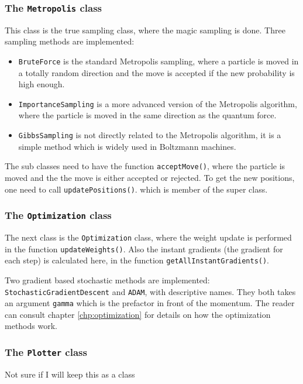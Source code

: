 \subsubsection{The \lstinline{Metropolis} class}
This class is the true sampling class, where the magic sampling is done. Three sampling methods are implemented:
\begin{itemize}
	\item \lstinline{BruteForce} is the standard Metropolis sampling, where a particle is moved in a totally random direction and the move is accepted if the new probability is high enough.

	\item \lstinline{ImportanceSampling} is a more advanced version of the Metropolis algorithm, where the particle is moved in the same direction as the quantum force.
	
	\item \lstinline{GibbsSampling} is not directly related to the Metropolis algorithm, it is a simple method which is widely used in Boltzmann machines.
\end{itemize}
The sub classes need to have the function \lstinline{acceptMove()}, where the particle is moved and the the move is either accepted or rejected. To get the new positions, one need to call \lstinline{updatePositions()}. which is member of the super class. 

\subsubsection{The \lstinline{Optimization} class}
The next class is the \lstinline{Optimization} class, where the weight update is performed in the function \lstinline{updateWeights()}. Also the instant gradients (the gradient for each step) is calculated here, in the function \lstinline{getAllInstantGradients()}.

Two gradient based stochastic methods are implemented: \lstinline{StochasticGradientDescent} and \lstinline{ADAM}, with descriptive names. They both takes an argument \lstinline{gamma} which is the prefactor in front of the momentum. The reader can consult chapter \eqref{chp:optimization} for details on how the optimization methods work. 

\subsubsection{The \lstinline{Plotter} class}
Not sure if I will keep this as a class

